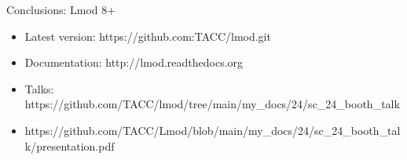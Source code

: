 \documentclass{beamer}
\begin{document}
\begin{frame}{Conclusions: Lmod 8+}
  \begin{itemize}
    \item Latest version: https://github.com:TACC/lmod.git
    \item Documentation:  http://lmod.readthedocs.org
    \item Talks:          https://github.com/TACC/lmod/tree/main/my\_docs/24/sc\_24\_booth\_talk
    \item https://github.com/TACC/Lmod/blob/main/my\_docs/24/sc\_24\_booth\_talk/presentation.pdf
  \end{itemize}
\end{frame}
\end{document}

